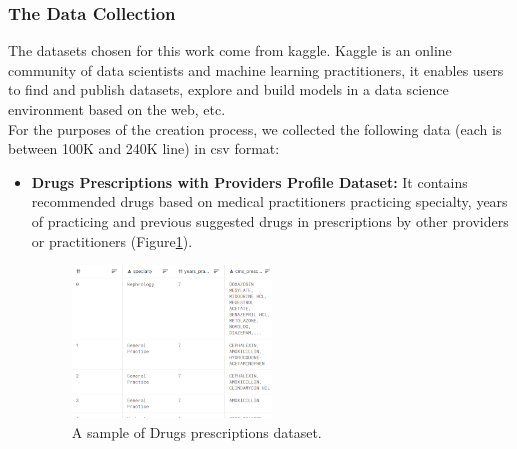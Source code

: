 \subsubsection*{The Data Collection}
The datasets chosen for this work come from kaggle\cite{KaggleYourHome}. Kaggle is an online community of data scientists and machine learning practitioners\cite{Kaggle2022}, it enables users to find and publish datasets, explore and build models in a data science environment based on the web, etc.\\
For the purposes of the creation process, we collected the following data (each is between 100K and 240K line) in csv format:
\begin{itemize}
  \renewcommand{\labelitemi}{$\bullet$}
  \item \textbf{Drugs Prescriptions with Providers Profile Dataset: }It contains recommended drugs based on medical practitioners  practicing specialty, years of practicing and previous suggested drugs in prescriptions by other providers or practitioners (Figure\ref{fig:drugs}).
  
  \begin{figure}[h!]
    \center
    \includegraphics[width=0.50\textwidth]{images/chapter3/dataset/medicine_prescription_records - Copie.PNG}
    \caption{A sample of Drugs prescriptions dataset.}
    \label{fig:drugs}
  \end{figure}
 

\end{itemize}
